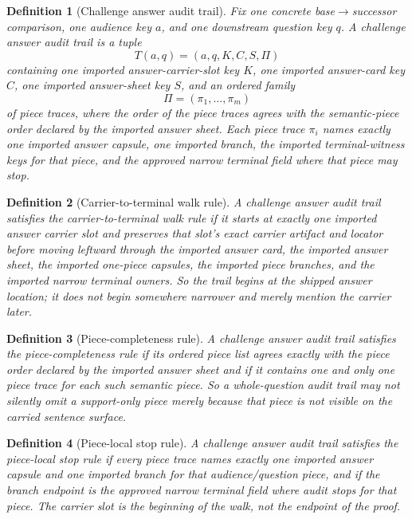 \documentclass[11pt]{article}
\newtheorem{definition}{Definition}
\begin{document}
\begin{definition}[Challenge answer audit trail]
Fix one concrete base$\to$successor comparison, one audience key $a$, and one downstream question key $q$.
A \emph{challenge answer audit trail} is a tuple
\[
T(a,q)=(a,q,K,C,S,\Pi)
\]
containing one imported answer-carrier-slot key $K$, one imported answer-card key $C$, one imported answer-sheet key $S$, and an ordered family
\[
\Pi=(\pi_1,\dots,\pi_m)
\]
of piece traces, where the order of the piece traces agrees with the semantic-piece order declared by the imported answer sheet.
Each piece trace $\pi_i$ names exactly one imported answer capsule, one imported branch, the imported terminal-witness keys for that piece, and the approved narrow terminal field where that piece may stop.
\end{definition}

\begin{definition}[Carrier-to-terminal walk rule]
A challenge answer audit trail satisfies the \emph{carrier-to-terminal walk rule} if it starts at exactly one imported answer carrier slot and preserves that slot's exact carrier artifact and locator before moving leftward through the imported answer card, the imported answer sheet, the imported one-piece capsules, the imported piece branches, and the imported narrow terminal owners.
So the trail begins at the shipped answer location; it does not begin somewhere narrower and merely mention the carrier later.
\end{definition}

\begin{definition}[Piece-completeness rule]
A challenge answer audit trail satisfies the \emph{piece-completeness rule} if its ordered piece list agrees exactly with the piece order declared by the imported answer sheet and if it contains one and only one piece trace for each such semantic piece.
So a whole-question audit trail may not silently omit a support-only piece merely because that piece is not visible on the carried sentence surface.
\end{definition}

\begin{definition}[Piece-local stop rule]
A challenge answer audit trail satisfies the \emph{piece-local stop rule} if every piece trace names exactly one imported answer capsule and one imported branch for that audience/question piece, and if the branch endpoint is the approved narrow terminal field where audit stops for that piece.
The carrier slot is the beginning of the walk, not the endpoint of the proof.
\end{definition}
\end{document}
